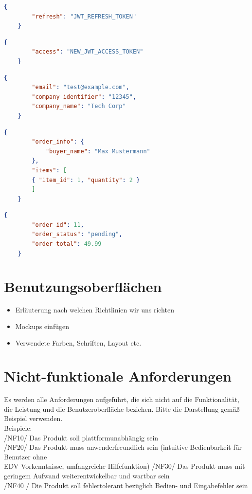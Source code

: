 \documentclass[%
	ngerman,
	12pt,
	a4paper,
	oneside,
	parskip=full
]{scrbook}
\begin{document}
\begin{lstlisting}[language=json, caption={Request für Token Refresh}, label=lst:refresh-request]
	{
		"refresh": "JWT_REFRESH_TOKEN"
	}
\end{lstlisting}

\begin{lstlisting}[language=json, caption={Response für Token Refresh}, label=lst:refresh-response]
	{
		"access": "NEW_JWT_ACCESS_TOKEN"
	}
\end{lstlisting}

\begin{lstlisting}[language=json, caption={Response für Profilabruf}, label=lst:profile-response]
	{
		"email": "test@example.com",
		"company_identifier": "12345",
		"company_name": "Tech Corp"
	}
\end{lstlisting}

\begin{lstlisting}[language=json, caption={Request für Bestellungen}, label=lst:order-request]
	{
		"order_info": {
			"buyer_name": "Max Mustermann"
		},
		"items": [
		{ "item_id": 1, "quantity": 2 }
		]
	}
\end{lstlisting}

\begin{lstlisting}[language=json, caption={Response für Bestellungen}, label=lst:order-response]
	{
		"order_id": 11,
		"order_status": "pending",
		"order_total": 49.99
	}
\end{lstlisting}

\chapter{Benutzungsoberflächen}
\begin{itemize}
	\item Erläuterung nach welchen Richtlinien wir uns richten
	\item Mockups einfügen
	\item Verwendete Farben, Schriften, Layout etc.
\end{itemize}

\chapter{Nicht-funktionale Anforderungen}
Es werden alle Anforderungen aufgeführt, die sich nicht auf die Funktionalität, die Leistung
und die Benutzeroberfläche beziehen.
Bitte die Darstellung gemäß Beispiel verwenden.\\
Beispiele:\\
/NF10/ Das Produkt soll plattformunabhängig sein \\
/NF20/ Das Produkt muss anwenderfreundlich sein (intuitive Bedienbarkeit für Benutzer ohne\\
EDV-Vorkenntnisse, umfangreiche Hilfefunktion)
/NF30/ Das Produkt muss mit geringem Aufwand weiterentwickelbar und wartbar sein\\
/NF40 / Die Produkt soll fehlertolerant bezüglich Bedien- und Eingabefehler sein\\
\end{document}
